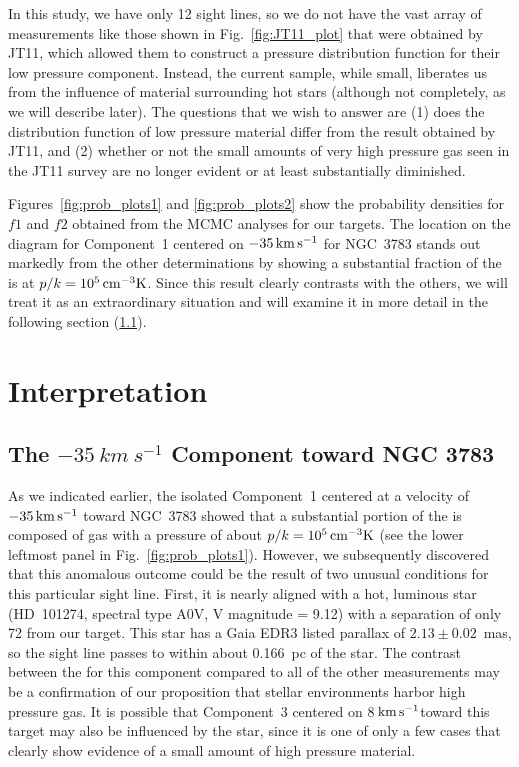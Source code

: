 \documentclass[modern]{aastex63}
\newcommand{\kms}{\ensuremath{\,\rm{km\,s^{-1}}}}
\newcommand{\cmk}{\ensuremath{\,\rm{cm^{-3}K}}}
\begin{document}
In this study, we have only 12 sight lines, so we do not have the vast array of measurements like 
those shown in Fig.~\ref{fig:JT11_plot} that were obtained by JT11, which allowed them to 
construct a pressure distribution function for their low pressure component.  Instead, the 
current sample, while small, liberates us from the influence of material surrounding hot stars 
(although not completely, as we will describe later).  The questions that we wish to answer are 
(1) does the distribution function of low pressure material differ from the result obtained by 
JT11, and (2) whether or not the small amounts of very high pressure gas seen in the JT11 
survey are no longer evident or at least substantially diminished.

Figures~\ref{fig:prob_plots1} and \ref{fig:prob_plots2} show the probability densities for $f1$ 
and $f2$ obtained from the MCMC analyses for our targets.  The location on the diagram for 
Component~1 centered on $-35\kms$ for NGC~3783 stands out markedly from the other 
determinations by showing a substantial fraction of the  is at $p/k=10^5\cmk$.  Since 
this result clearly contrasts with the others, we will treat it as an extraordinary situation and will 
examine it in more detail in the following section (\ref{sec:NGC3783}). 
\newpage
\section{Interpretation}\label{sec:interpretation}

\subsection{The $\mathit{-35~km~s^{-1}}$ Component toward NGC 3783}\label{sec:NGC3783}

As we indicated earlier, the isolated Component~1 centered at a velocity of $-35\kms$ toward 
NGC~3783 showed that a substantial portion of the  is composed of gas with a 
pressure of about $p/k=10^5\cmk$ (see the lower leftmost panel in Fig.~\ref{fig:prob_plots1}).  
However, we subsequently discovered that this anomalous outcome could be the result of two 
unusual conditions for this particular sight line.  First, it is nearly aligned with a hot, luminous 
star (HD~101274, spectral type A0V, V magnitude = 9.12) with a separation of only 72 
from our target.  This star has a Gaia EDR3 listed parallax of $2.13\pm 0.02$~mas, so the sight 
line passes to within about 0.166~pc of the star.  The contrast between the  for this 
component compared to all of the other measurements may be a confirmation of our 
proposition that stellar environments harbor high pressure gas.  It is possible that 
Component~3 centered on 8\kms toward this target may also be influenced by the star, since it 
is one of only a few cases that clearly show evidence of a small amount of high pressure 
material.
\end{document}
